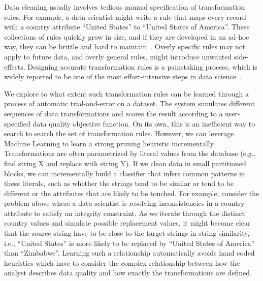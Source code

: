 Data cleaning usually involves tedious manual specification of transformation rules.
For example, a data scientist might write a rule that maps every record with a \textsf{country} attribute ``United States'' to ``United States of America''.
These collections of rules quickly grow in size, and if they are developed in an ad-hoc way, they can be brittle and hard to maintain~\cite{krishnan2016hilda}.
Overly specific rules may not apply to future data, and overly general rules, might introduce unwanted side-effects.
Designing accurate transformation rules is a painstaking process, which is widely reported to be one of the most effort-intensive steps in data science~\cite{nytimes}.

We explore to what extent such transformation rules can be learned through a process of automatic trial-and-error on a dataset.
The system simulates different sequences of data transformations and scores the result according to a user-specified data quality objective function.
On its own, this is an inefficient way to search to search the set of transformation rules.
However, we can leverage Machine Learning to learn a strong pruning heuristic incrementally.
Transformations are often parametrized by literal values from the database (e.g., find string X and replace with string Y).
If we clean data in small partitioned blocks, we can incrementally build a classifier that infers common patterns in these literals, such as whether the strings tend to be similar or tend to be different or the attributes that are likely to be touched.
For example, consider the problem above where a data scientist is resolving inconsistencies in a \textsf{country} attribute to satisfy an integrity constraint.
As we iterate through the distinct \textsf{country} values and simulate possible replacement values, it might become clear that the source string have to be close to the target strings in string similarity, i.e., ``United States'' is more likely to be replaced by ``United States of America'' than ``Zimbabwe''.
Learning such a relationship automatically avoids hand coded heuristics which have to consider the complex relationship between how the analyst describes data quality and how exactly the transformations are defined.

